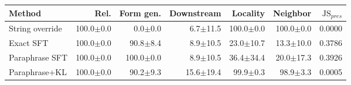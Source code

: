 \begin{tabular}{lrrrrrr}
\toprule
Method & Rel. & Form gen. & Downstream & Locality & Neighbor & $\mathrm{JS}_{pres}$ \\ 
\midrule
String override & 100.0$\pm$0.0 & 0.0$\pm$0.0 & 6.7$\pm$11.5 & 100.0$\pm$0.0 & 100.0$\pm$0.0 & 0.0000 \\ 
Exact SFT & 100.0$\pm$0.0 & 90.8$\pm$8.4 & 8.9$\pm$10.5 & 23.0$\pm$10.7 & 13.3$\pm$10.0 & 0.3786 \\ 
Paraphrase SFT & 100.0$\pm$0.0 & 100.0$\pm$0.0 & 8.9$\pm$10.5 & 36.4$\pm$34.4 & 20.0$\pm$17.3 & 0.3926 \\ 
Paraphrase+KL & 100.0$\pm$0.0 & 90.2$\pm$9.3 & 15.6$\pm$19.4 & 99.9$\pm$0.3 & 98.9$\pm$3.3 & 0.0005 \\ 
\bottomrule
\end{tabular}
